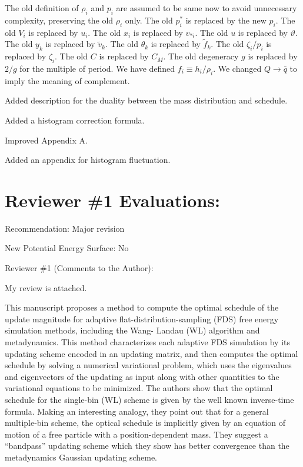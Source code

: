 \documentclass[preprint, superscriptaddress, floatfix]{revtex4-1}
\begin{document}
The old definition of $\rho_i$ and $p_i$ are assumed to be same now
to avoid unnecessary complexity, preserving the old $\rho_i$ only.
The old $p^*_i$ is replaced by the new $p_i$.
The old $V_i$ is replaced by $u_i$.
The old $x_i$ is replaced by $v_{*i}$.
The old $u$ is replaced by $\vartheta$.
The old $y_k$ is replaced by $\tilde v_k$.
The old $\theta_k$ is replaced by $\tilde f_k$.
The old $\zeta_i/p_i$ is replaced by $\zeta_i$.
The old $C$ is replaced by $C_M$.
The old degeneracy $g$ is replaced by $2/g$ for the multiple of period.
%
We have defined $f_i \equiv h_i/\rho_i$.
We changed $Q \to \bar q$ to imply the meaning of complement.

Added description for the duality between the mass distribution and schedule.

Added a histogram correction formula.

Improved Appendix A.

Added an appendix for histogram fluctuation.


\section{Reviewer \#1 Evaluations:}

Recommendation: Major revision

New Potential Energy Surface: No

Reviewer \#1 (Comments to the Author):

My review is attached.

This manuscript proposes a method to compute the optimal schedule of the update magnitude for
adaptive flat-distribution-sampling (FDS) free energy simulation methods, including the Wang-
Landau (WL) algorithm and metadynamics. This method characterizes each adaptive FDS
simulation by its updating scheme encoded in an updating matrix, and then computes the optimal
schedule by solving a numerical variational problem, which uses the eigenvalues and
eigenvectors of the updating as input along with other quantities to the variational equations to
be minimized. The authors show that the optimal schedule for the single-bin (WL) scheme is
given by the well known inverse-time formula. Making an interesting analogy, they point out
that for a general multiple-bin scheme, the optical schedule is implicitly given by an equation of
motion of a free particle with a position-dependent mass. They suggest a “bandpass” updating
scheme which they show has better convergence than the metadynamics Gaussian updating
scheme.
\end{document}
